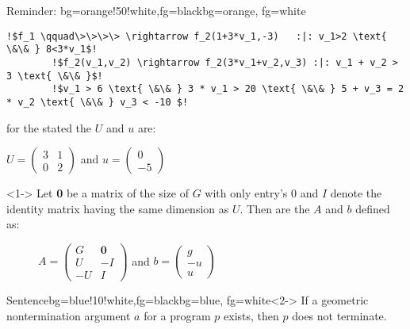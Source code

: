 \begin{frame}[fragile]
	\begin{variableblock}{Reminder: \its}{bg=orange!50!white,fg=black}{bg=orange, fg=white}
		\begin{lstlisting}[linewidth=10.5cm, escapechar = !]
		!$f_1 \qquad\>\>\>\> \rightarrow f_2(1+3*v_1,-3)   :|: v_1>2 \text{ \&\& } 8<3*v_1$!
		!$f_2(v_1,v_2) \rightarrow f_2(3*v_1+v_2,v_3) :|: v_1 + v_2 > 3 \text{ \&\& }$! 
		!$v_1 > 6 \text{ \&\& } 3 * v_1 > 20 \text{ \&\& } 5 + v_3 = 2 * v_2 \text{ \&\& } v_3 < -10 $!
		\end{lstlisting}
	\end{variableblock}
		\begin{example}[\updatematrix, \updateconstants]
			for the stated \its the \updatematrix $U$ and \updateconstants $u$ are:\newline
			\begin{center}
				\vspace{-2em}
				$U = \begin{pmatrix} 3 & 1 \\ 0 & 2 \end{pmatrix}$ and $u = \begin{pmatrix} 0 \\ -5 \end{pmatrix}$
			\end{center}		
		\end{example}
\end{frame}

\begin{frame}
	\begin{definition}[\iterationmatrix, \iterationconstants]<1->
		Let \textbf{0} be a matrix of the size of $G$ with only entry's 0 and $I$ denote the identity matrix having the same dimension as $U$. Then are the \iterationmatrix $A$ and \iterationconstants $b$ defined as:
		\begin{figure}[H]
			\centering
			$A = \begin{pmatrix} G & \textbf{0} \\ U & -I \\ -U & I \end{pmatrix}$ and $b = \begin{pmatrix} g \\ -u \\ u \end{pmatrix}$
		\end{figure}
	\end{definition}
	\begin{variableblock}{Sentence}{bg=blue!10!white,fg=black}{bg=blue, fg=white}<2->
		If a geometric nontermination argument $a$ for a program $p$ exists, then $p$ does
		not terminate.
	\end{variableblock}
\end{frame}

